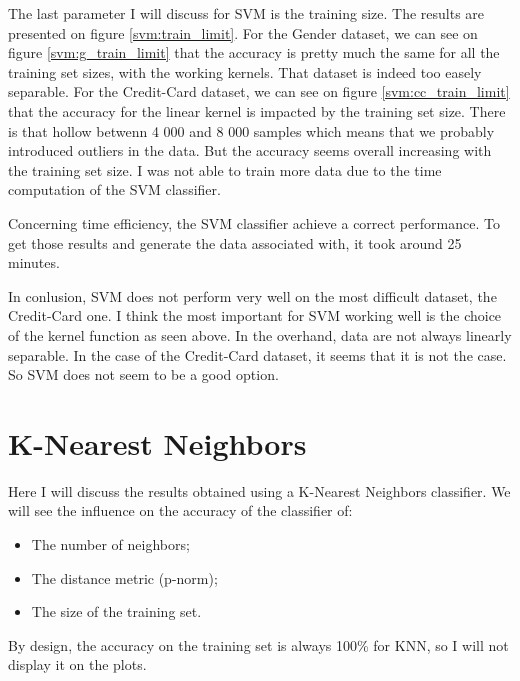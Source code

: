 \documentclass[10pt]{article}
\begin{document}
		The last parameter I will discuss for SVM is the training size. The results are presented on figure \ref{svm:train_limit}.
		For the Gender dataset, we can see on figure \ref{svm:g_train_limit} that the accuracy is pretty much the same for all the training set sizes, with the working kernels. That dataset is indeed too easely separable.
		For the Credit-Card dataset, we can see on figure \ref{svm:cc_train_limit} that the accuracy for the linear kernel is impacted by the training set size. There is that hollow betwenn 4 000 and 8 000 samples which means that we probably introduced outliers in the data. But the accuracy seems overall increasing with the training set size. I was not able to train more data due to the time computation of the SVM classifier.

		Concerning time efficiency, the SVM classifier achieve a correct performance. To get those results and generate the data associated with, it took around 25 minutes.

		In conlusion, SVM does not perform very well on the most difficult dataset, the Credit-Card one. I think the most important for SVM working well is the choice of the kernel function as seen above. In the overhand, data are not always linearly separable. In the case of the Credit-Card dataset, it seems that it is not the case. So SVM does not seem to be a good option.
	\section{K-Nearest Neighbors}
		Here I will discuss the results obtained using a K-Nearest Neighbors classifier. We will see the influence on the accuracy of the classifier of:
		\begin{itemize}
			\item The number of neighbors;
			\item The distance metric (p-norm);
			\item The size of the training set.
		\end{itemize}
		By design, the accuracy on the training set is always 100\% for KNN, so I will not display it on the plots.
\end{document}
